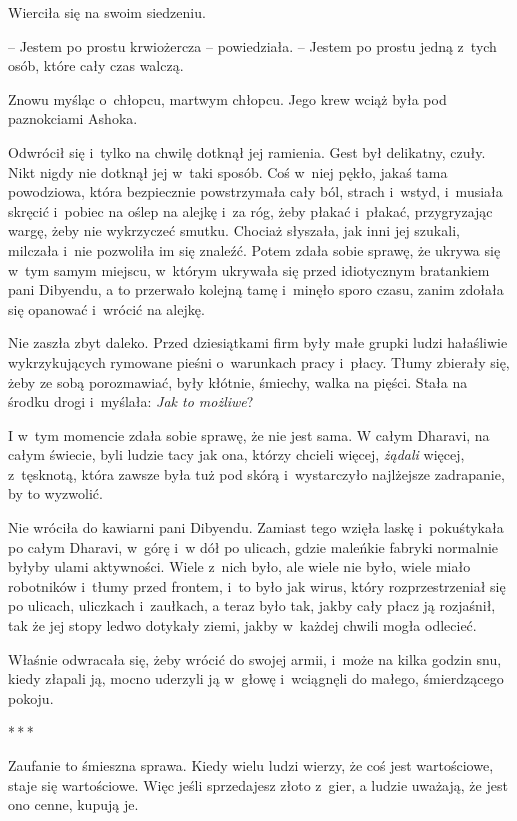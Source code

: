 \documentclass[oneside,polish,11pt,rmheadings]{mwbk}
\newcommand{\threeast}{\par\centerline{*\,*\,*}\medskip\par}
\begin{document}
Wierciła się na swoim siedzeniu. 

-- Jestem po prostu krwiożercza -- powiedziała. -- Jestem po prostu jedną z~tych osób, które cały czas walczą. 

Znowu myśląc o~chłopcu, martwym chłopcu. Jego krew wciąż była pod paznokciami Ashoka.

Odwrócił się i~tylko na chwilę dotknął jej ramienia. Gest był delikatny, czuły. Nikt nigdy nie dotknął jej w~taki sposób. Coś w~niej pękło, jakaś tama powodziowa, która bezpiecznie powstrzymała cały ból, strach i~wstyd, i~musiała skręcić i~pobiec na oślep na alejkę i~za róg, żeby płakać i~płakać, przygryzając wargę, żeby nie wykrzyczeć smutku. Chociaż słyszała, jak inni jej szukali, milczała i~nie pozwoliła im się znaleźć. Potem zdała sobie sprawę, że ukrywa się w~tym samym miejscu, w~którym ukrywała się przed idiotycznym bratankiem pani Dibyendu, a to przerwało kolejną tamę i~minęło sporo czasu, zanim zdołała się opanować i~wrócić na alejkę.

Nie zaszła zbyt daleko. Przed dziesiątkami firm były małe grupki ludzi hałaśliwie wykrzykujących rymowane pieśni o~warunkach pracy i~płacy. Tłumy zbierały się, żeby ze sobą porozmawiać, były kłótnie, śmiechy, walka na pięści. Stała na środku drogi i~myślała: \textit{Jak to możliwe}? 

I w~tym momencie zdała sobie sprawę, że nie jest sama. W całym Dharavi, na całym świecie, byli ludzie tacy jak ona, którzy chcieli więcej, \textit{żądali }więcej, z~tęsknotą, która zawsze była tuż pod skórą i~wystarczyło najlżejsze zadrapanie, by to wyzwolić.

Nie wróciła do kawiarni pani Dibyendu. Zamiast tego wzięła laskę i~pokuśtykała po całym Dharavi, w~górę i~w dół po ulicach, gdzie maleńkie fabryki normalnie byłyby ulami aktywności. Wiele z~nich było, ale wiele nie było, wiele miało robotników i~tłumy przed frontem, i~to było jak wirus, który rozprzestrzeniał się po ulicach, uliczkach i~zaułkach, a teraz było tak, jakby cały płacz ją rozjaśnił, tak że jej stopy ledwo dotykały ziemi, jakby w~każdej chwili mogła odlecieć.

Właśnie odwracała się, żeby wrócić do swojej armii, i~może na kilka godzin snu, kiedy złapali ją, mocno uderzyli ją w~głowę i~wciągnęli do małego, śmierdzącego pokoju.

\bigskip
\threeast

Zaufanie to śmieszna sprawa. Kiedy wielu ludzi wierzy, że coś jest wartościowe, staje się wartościowe. Więc jeśli sprzedajesz złoto z~gier, a ludzie uważają, że jest ono cenne, kupują je.
\end{document}
